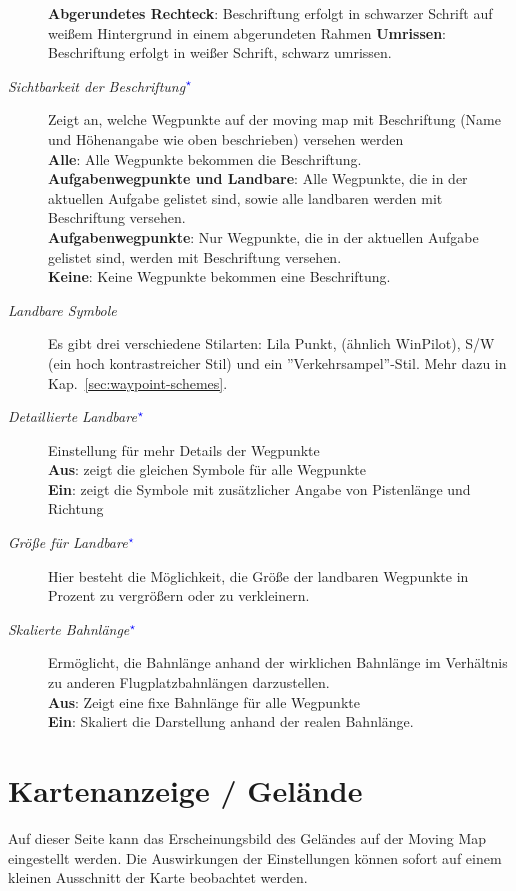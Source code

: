 \begin{description}
    {\bf Abgerundetes Rechteck}: Beschriftung erfolgt in schwarzer Schrift auf weißem Hintergrund in einem abgerundeten Rahmen
    {\bf Umrissen}: Beschriftung erfolgt in weißer Schrift, schwarz umrissen.
\item[\textit{Sichtbarkeit der Beschriftung$^{\textcolor{blue}{\star}}$}]  \label{conf:labelvisibility}
   Zeigt an, welche Wegpunkte auf der moving map mit Beschriftung (Name und Höhenangabe wie oben
   beschrieben)  versehen werden \\
   {\bf Alle}: Alle Wegpunkte bekommen die Beschriftung. \\
   {\bf Aufgabenwegpunkte und Landbare}: Alle Wegpunkte, die in der aktuellen Aufgabe gelistet sind,
   sowie alle landbaren werden mit Beschriftung versehen. \\
   {\bf Aufgabenwegpunkte}:  Nur Wegpunkte, die in der aktuellen Aufgabe gelistet sind, werden
   mit Beschriftung versehen. \\
   {\bf Keine}:  Keine Wegpunkte bekommen eine Beschriftung.
\item[\textit{Landbare Symbole}]  \label{conf:waypointicons} Es gibt drei verschiedene Stilarten:
   Lila Punkt, (ähnlich WinPilot), S/W (ein hoch kontrastreicher Stil) und ein ''Verkehrsampel''-Stil.
   Mehr dazu in Kap.~\ref{sec:waypoint-schemes}.
\item[\textit{Detaillierte Landbare$^{\textcolor{blue}{\star}}$}]  Einstellung für mehr Details der Wegpunkte\\
  {\bf Aus}: zeigt die gleichen Symbole für alle Wegpunkte\\
  {\bf Ein}: zeigt die Symbole mit zusätzlicher Angabe von Pistenlänge und Richtung
\item[\textit{Größe für Landbare$^{\textcolor{blue}{\star}}$}]  Hier besteht die Möglichkeit, die Größe der landbaren    Wegpunkte in Prozent zu vergrößern oder zu verkleinern.
\item[\textit{Skalierte Bahnlänge$^{\textcolor{blue}{\star}}$}] Ermöglicht, die Bahnlänge anhand der wirklichen Bahnlänge im Verhältnis zu anderen
   Flugplatzbahnlängen darzustellen.\\
{\bf Aus}: Zeigt eine fixe Bahnlänge für alle Wegpunkte\\
{\bf Ein}: Skaliert die Darstellung anhand der realen Bahnlänge.\\

\end{description}


\section{Kartenanzeige / Gelände}\label{sec:terrain-display}
Auf dieser Seite kann das Erscheinungsbild des Geländes auf der Moving Map eingestellt werden.
Die Auswirkungen der Einstellungen können sofort auf einem kleinen Ausschnitt  
der Karte beobachtet werden.

